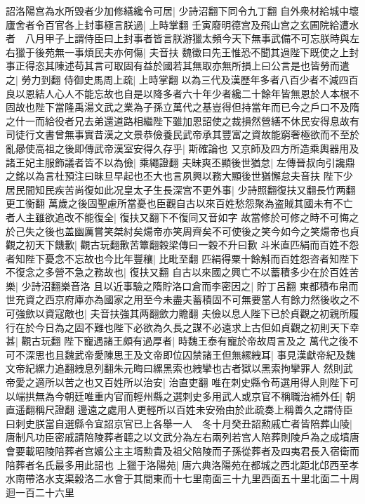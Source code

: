 詔洛陽宫為水所毁者少加修繕纔令可居|{
	少詩沼翻下同令九丁翻}
自外衆材給城中壞廬舍者令百官各上封事極言朕過|{
	上時掌翻}
壬寅廢明德宫及飛山宫之玄圃院給遭水者　八月甲子上謂侍臣曰上封事者皆言朕游獵太頻今天下無事武備不可忘朕時與左右獵于後苑無一事煩民夫亦何傷|{
	夫音扶}
魏徵曰先王惟恐不聞其過陛下既使之上封事正得恣其陳述苟其言可取固有益於國若其無取亦無所損上曰公言是也皆勞而遣之|{
	勞力到翻}
侍御史馬周上疏|{
	上時掌翻}
以為三代及漢歷年多者八百少者不減四百良以恩結人心人不能忘故也自是以降多者六十年少者纔二十餘年皆無恩於人本根不固故也陛下當隆禹湯文武之業為子孫立萬代之基豈得但持當年而已今之戶口不及隋之什一而給役者兄去弟還道路相繼陛下雖加恩詔使之裁損然營繕不休民安得息故有司徒行文書曾無事實昔漢之文景恭儉養民武帝承其豐富之資故能窮奢極欲而不至於亂曏使高祖之後即傳武帝漢室安得久存乎|{
	斯確論也}
又京師及四方所造乘輿器用及諸王妃主服飾議者皆不以為儉|{
	乘繩證翻}
夫昧爽丕顯後世猶怠|{
	左傳晉叔向引讒鼎之銘以為言杜預注曰昧旦早起也丕大也言夙興以務大顯後世猶懈怠夫音扶}
陛下少居民間知民疾苦尚復如此况皇太子生長深宫不更外事|{
	少詩照翻復扶又翻長竹两翻更工衡翻}
萬歲之後固聖慮所當憂也臣觀自古以來百姓愁怨聚為盗賊其國未有不亡者人主雖欲追改不能復全|{
	復扶又翻下不復同又音如字}
故當修於可修之時不可悔之於己失之後也盖幽厲嘗笑桀紂矣煬帝亦笑周齊矣不可使後之笑今如今之笑煬帝也貞觀之初天下饑歉|{
	觀古玩翻歉苦簟翻穀梁傳曰一穀不升曰歉}
斗米直匹絹而百姓不怨者知陛下憂念不忘故也今比年豐穰|{
	比毗至翻}
匹絹得粟十餘斛而百姓怨咨者知陛下不復念之多營不急之務故也|{
	復扶又翻}
自古以來國之興亡不以蓄積多少在於百姓苦樂|{
	少詩沼翻樂音洛}
且以近事驗之隋貯洛口倉而李密因之|{
	貯丁呂翻}
東都積布帛而世充資之西京府庫亦為國家之用至今未盡夫蓄積固不可無要當人有餘力然後收之不可強歛以資寇敵也|{
	夫音扶強其两翻歛力贍翻}
夫儉以息人陛下已於貞觀之初親所履行在於今日為之固不難也陛下必欲為久長之謀不必遠求上古但如貞觀之初則天下幸甚|{
	觀古玩翻}
陛下寵遇諸王頗有過厚者|{
	時魏王泰有寵於帝故周言及之}
萬代之後不可不深思也且魏武帝愛陳思王及文帝即位囚禁諸王但無縲絏耳|{
	事見漢獻帝紀及魏文帝紀縲力追翻絏息列翻朱元晦曰縲黑索也絏攣也古者獄以黑索拘攣罪人}
然則武帝愛之適所以苦之也又百姓所以治安|{
	治直吏翻}
唯在刺史縣令苟選用得人則陛下可以端拱無為今朝廷唯重内官而輕州縣之選刺史多用武人或京官不稱職治補外任|{
	朝直遥翻稱尺證翻}
邊遠之處用人更輕所以百姓未安殆由於此疏奏上稱善久之謂侍臣曰刺史朕當自選縣令宜詔京官已上各舉一人　冬十月癸丑詔勲戚亡者皆陪葬山陵|{
	唐制凡功臣密戚請陪陵葬者聼之以文武分為左右兩列若宫人陪葬則陵戶為之成墳唐會要載昭陵陪葬者宫嬪公主主壻勲貴及祖父陪陵而子孫從葬者及四夷君長入宿衛而陪葬者名氏最多用此詔也}
上獵于洛陽苑|{
	唐六典洛陽苑在都城之西北距北邙西至孝水南帶洛水支渠穀洛二水會于其間東而十七里南面三十九里西面五十里北面二十周迴一百二十六里}
